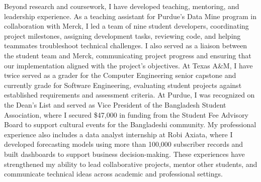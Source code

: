 \documentclass{article}
\begin{document}
Beyond research and coursework, I have developed teaching, mentoring, and leadership experience. As a teaching assistant for Purdue's Data Mine program in collaboration with Merck, I led a team of nine student developers, coordinating project milestones, assigning development tasks, reviewing code, and helping teammates troubleshoot technical challenges. I also served as a liaison between the student team and Merck, communicating project progress and ensuring that our implementation aligned with the project's objectives. At Texas A\&M, I have twice served as a grader for the Computer Engineering senior capstone and currently grade for Software Engineering, evaluating student projects against established requirements and assessment criteria. At Purdue, I was recognized on the Dean's List and served as Vice President of the Bangladesh Student Association, where I secured \$47,000 in funding from the Student Fee Advisory Board to support cultural events for the Bangladeshi community. My professional experience also includes a data analyst internship at Robi Axiata, where I developed forecasting models using more than 100,000 subscriber records and built dashboards to support business decision-making. These experiences have strengthened my ability to lead collaborative projects, mentor other students, and communicate technical ideas across academic and professional settings.









\vspace{0.125in}


\end{document}
